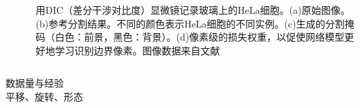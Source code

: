 \documentclass{beamer}%
\begin{document}
\begin{frame}
\begin{columns}
\begin{column}{0.6\linewidth}
\begin{figure}
\label{fig:fastdata}
\end{figure}

	\end{column}

	\begin{column}{0.4\linewidth}
   \footnotesize
			用DIC（差分干涉对比度）显微镜记录玻璃上的HeLa细胞。(a)原始图像。(b)参考分割结果。不同的颜色表示HeLa细胞的不同实例。(c)生成的分割掩码（白色：前景，黑色：背景）。(d)像素级的损失权重，以促使网络模型更好地学习识别边界像素。图像数据来自文献\citet{Unet2015Olaf}
	\end{column}
\end{columns}

\vspace{0.2cm}

数据量与经验\\
平移、旋转、形态


\end{frame}
\end{document}
